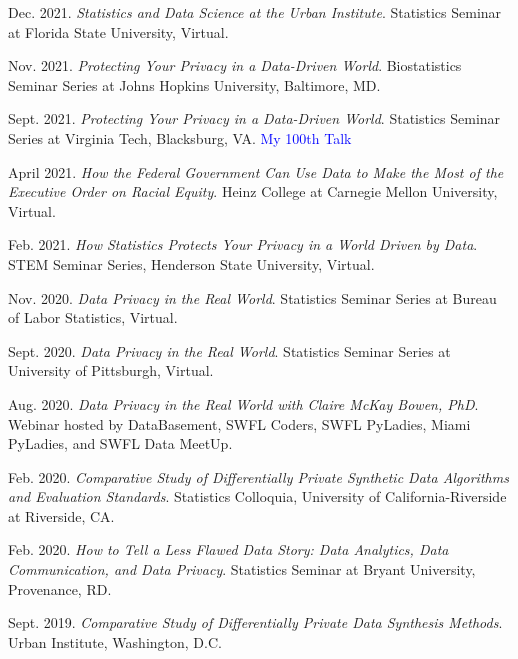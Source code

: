 \begin{etaremune}[topsep=0pt, itemsep=4pt, partopsep=0pt, parsep=0pt]
    \item Dec. 2021. \textit{Statistics and Data Science at the Urban Institute}. Statistics Seminar at Florida State University, Virtual.
    
    \item Nov. 2021. \textit{Protecting Your Privacy in a Data-Driven World}. Biostatistics Seminar Series at Johns Hopkins University, Baltimore, MD.
    
    \item Sept. 2021. \textit{Protecting Your Privacy in a Data-Driven World}. Statistics Seminar Series at Virginia Tech, Blacksburg, VA. \textcolor{blue}{My 100th Talk}
    
    \item April 2021. \textit{How the Federal Government Can Use Data to Make the Most of the Executive Order on Racial Equity}. Heinz College at Carnegie Mellon University, Virtual.

    \item Feb. 2021. \textit{How Statistics Protects Your Privacy in a World Driven by Data}. STEM Seminar Series, Henderson State University, Virtual.

    \item Nov. 2020. \textit{Data Privacy in the Real World}. Statistics Seminar Series at Bureau of Labor Statistics, Virtual.

    \item Sept. 2020. \textit{Data Privacy in the Real World}. Statistics Seminar Series at University of Pittsburgh, Virtual.
        
    \item Aug. 2020. \textit{Data Privacy in the Real World with Claire McKay Bowen, PhD}. Webinar hosted by DataBasement, SWFL Coders, SWFL PyLadies, Miami PyLadies, and SWFL Data MeetUp.
    
    \item Feb. 2020. \textit{Comparative Study of Differentially Private Synthetic Data Algorithms and Evaluation Standards}. Statistics Colloquia, University of California-Riverside at Riverside, CA.
    
    \item Feb. 2020. \textit{How to Tell a Less Flawed Data Story: Data Analytics, Data Communication, and Data Privacy}. Statistics Seminar at Bryant University, Provenance, RD.
    
    \item Sept. 2019. \textit{Comparative Study of Differentially Private Data Synthesis Methods}. Urban Institute, Washington, D.C.
    

\end{etaremune}
